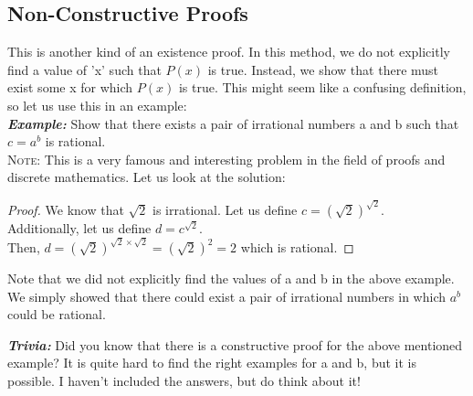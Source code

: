 \subsection{Non-Constructive Proofs}
This is another kind of an existence proof. In this method, we do not
explicitly find a value of 'x' such that $P(x)$ is true. Instead, we show that
there must exist some x for which $P(x)$ is true. This might seem like a
confusing definition, so let us use this in an example: \\
\indent \textbf{\emph{Example:}} Show that there exists a pair of irrational
numbers a and b such that $c = a^{b}$ is rational. \\
\textsc{Note:} This is a very famous and interesting problem in the field of
proofs and discrete mathematics. Let us look at the solution: \\
\begin{proof}
    We know that $\sqrt 2$ is irrational. Let us define $c = (\sqrt 2)^{\sqrt
    2}$. \\
    Additionally, let us define $d = c ^{\sqrt2}$. \\
    Then, $d = (\sqrt 2) ^{\sqrt 2 \times \sqrt 2} = (\sqrt 2) ^{2} = 2$ which
    is rational.
\end{proof}
Note that we did not explicitly find the values of a and b in the above
example. We simply showed that there could exist a pair of irrational numbers
in which $a^{b}$ could be rational.

\indent \textbf{\emph{Trivia: }} Did you know that there is a constructive
proof for the above mentioned example? It is quite hard to find the right
examples for a and b, but it is possible. I haven't included the answers, but
do think about it!
